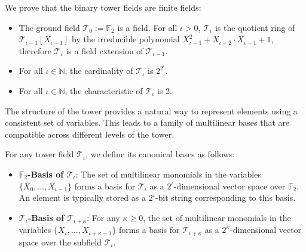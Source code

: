 \begin{theorem}
  We prove that the binary tower fields are finite fields:
  \label{thm:binary_tower_fields_are_fields}
    \begin{itemize}
      \item The ground field $\mathcal{T}_{0} := \mathbb{F}_2$ is a field. For all $\iota > 0$, $\mathcal{T}_{\iota}$ is the quotient ring of $\mathcal{T}_{\iota-1}[X_{\iota-1}]$ by the irreducible polynomial $X_{\iota-1}^{2}+X_{\iota-2} \cdot X_{\iota-1}+1$, therefore $\mathcal{T}_{\iota}$ is a field extension of $\mathcal{T}_{\iota-1}$.
      \item For all $\iota \in \mathbb{N}$, the cardinality of $\mathcal{T}_{\iota}$ is $2^{2^{\iota}}$.
      \item For all $\iota \in \mathbb{N}$, the characteristic of $\mathcal{T}_{\iota}$ is 2.
    \end{itemize}
\end{theorem}

The structure of the tower provides a natural way to represent elements using a consistent set of variables. This leads to a family of multilinear bases that are compatible across different levels of the tower.

\begin{definition}
    \label{def:multilinear_basis}
    For any tower field $\mathcal{T}_\iota$, we define its canonical bases as follows:
    \begin{itemize}
        \item \textbf{$\mathbb{F}_2$-Basis of $\mathcal{T}_\iota$}: The set of multilinear monomials in the variables $\{X_0, \dots, X_{\iota-1}\}$ forms a basis for $\mathcal{T}_\iota$ as a $2^\iota$-dimensional vector space over $\mathbb{F}_2$. An element is typically stored as a $2^\iota$-bit string corresponding to this basis.
        \item \textbf{$\mathcal{T}_\iota$-Basis of $\mathcal{T}_{\iota+\kappa}$}: For any $\kappa \ge 0$, the set of multilinear monomials in the variables $\{X_\iota, \dots, X_{\iota+\kappa-1}\}$ forms a basis for $\mathcal{T}_{\iota+\kappa}$ as a $2^\kappa$-dimensional vector space over the subfield $\mathcal{T}_\iota$.
    \end{itemize}
\end{definition}

